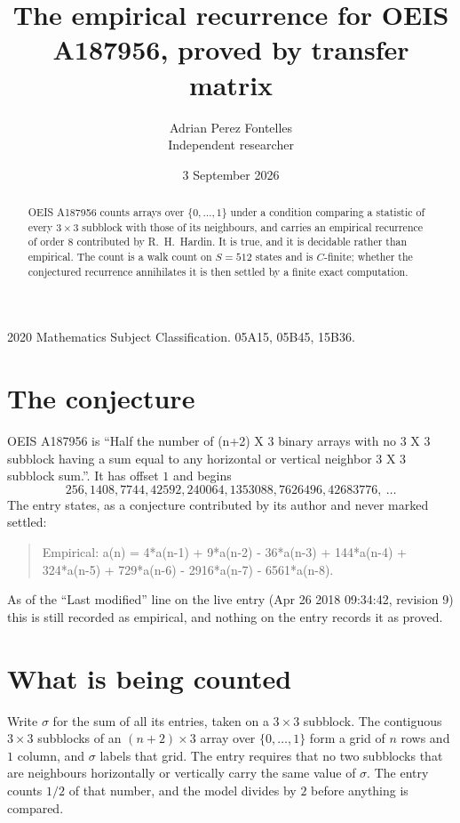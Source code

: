 \documentclass[11pt,a4paper]{article}
\title{The empirical recurrence for OEIS A187956, proved by transfer matrix}
\author{Adrian Perez Fontelles\\ \small Independent researcher}
\date{3 September 2026}
\theoremstyle{plain}
\theoremstyle{definition}
\begin{document}
\maketitle

\begin{abstract}
OEIS A187956 counts arrays over $\{0,\dots,1\}$ under a condition comparing a statistic of
every $3\times3$ subblock with those of its neighbours, and carries an empirical recurrence
of order $8$ contributed by R.~H.~Hardin. It is true, and it is decidable rather than
empirical. The count is a walk count on $S=512$ states and is $C$-finite; whether the
conjectured recurrence annihilates it is then settled by a finite exact computation.
\end{abstract}

\noindent\small 2020 Mathematics Subject Classification. 05A15, 05B45, 15B36.\normalsize

\section{The conjecture}

OEIS A187956 is ``Half the number of (n+2) X 3 binary arrays with no 3 X 3 subblock having a sum equal to any horizontal or vertical neighbor 3 X 3 subblock sum.''. It has offset $1$ and begins
\[
256, 1408, 7744, 42592, 240064, 1353088, 7626496, 42683776,\ \dots
\]
The entry states, as a conjecture contributed by its author and never marked settled:
\begin{quote}
Empirical: a(n) = 4*a(n-1) + 9*a(n-2) - 36*a(n-3) + 144*a(n-4) + 324*a(n-5) + 729*a(n-6) - 2916*a(n-7) - 6561*a(n-8).
\end{quote}
As of the ``Last modified'' line on the live entry (Apr 26 2018 09:34:42, revision 9) this is still
recorded as empirical, and nothing on the entry records it as proved.

\section{What is being counted}

Write $\sigma$ for the sum of all its entries, taken on a $3\times3$ subblock. The contiguous $3\times3$
subblocks of an $(n+2)\times3$ array over $\{0,\dots,1\}$ form a grid of $n$ rows
and $1$ column, and $\sigma$ labels that grid. The entry
requires that no two subblocks that are neighbours horizontally or vertically carry the same value of $\sigma$. The entry counts $1/2$ of that number, and the model divides by $2$ before anything is compared.
\end{document}
